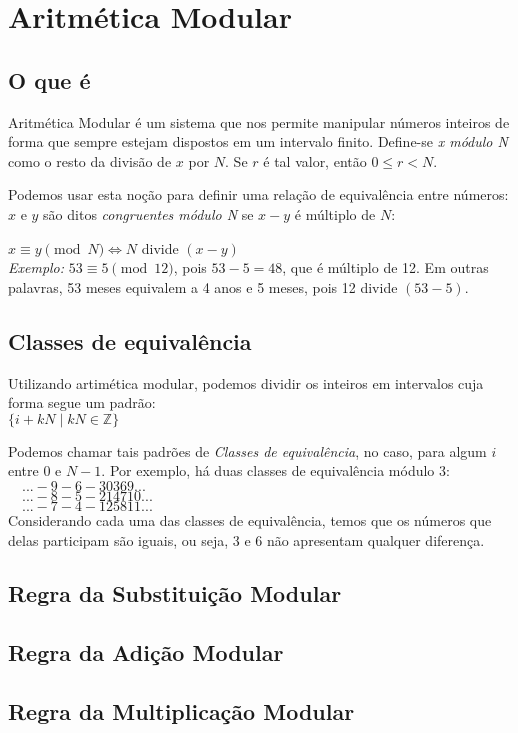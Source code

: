 \section{Aritmética Modular}
\vspace{1.5em}

\subsection{O que é}

Aritmética Modular é um sistema que nos permite manipular números inteiros de
forma que sempre estejam dispostos em um intervalo finito.
Define-se \textit{x módulo N} como o resto da divisão de $x$ por $N$. Se $r$ é
tal valor, então $0 \leq r < N$.

Podemos usar esta noção para definir uma relação de equivalência entre
números: $x$ e $y$ são ditos \textit{congruentes módulo N} se $x-y$ é múltiplo
de $N$:

$x \equiv y \pmod N \iff N$ divide $(x-y)$
\\

\textit{Exemplo:}
$53 \equiv 5 \pmod{12}$, pois $53-5 = 48$, que é múltiplo de 12. Em outras
palavras, 53 meses equivalem a 4 anos e 5 meses, pois 12 divide $(53-5)$.

\vspace{1.5em}
\subsection{Classes de equivalência}

Utilizando artimética modular, podemos dividir os inteiros em intervalos cuja
forma segue um padrão:\\

\quad $\{i + kN \; | \; kN \in \mathbb{Z}\}$

Podemos chamar tais padrões de \textit{Classes de equivalência}, no caso, para
algum $i$ entre $0$ e $N-1$. Por exemplo, há duas classes de equivalência
módulo 3:\\

$\quad ... -9 -6 -3 0 3 6 9 ...$\\
$\quad ... -8 -5 -2 1 4 7 10 ...$\\
$\quad ... -7 -4 -1 2 5 8 11 ...$\\

Considerando cada uma das classes de equivalência, temos que os números que
delas participam são iguais, ou seja, 3 e 6 não apresentam qualquer diferença.

\subsection{Regra da Substituição Modular}
\subsection{Regra da Adição Modular}
\subsection{Regra da Multiplicação Modular}
